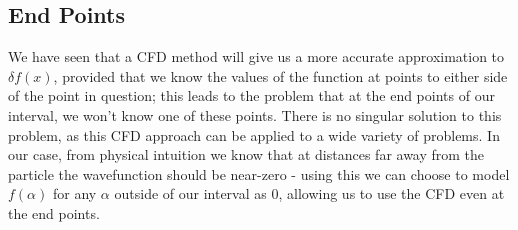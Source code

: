 \subsection{End Points}
We have seen that a CFD method will give us a more accurate approximation to $\delta f(x)$, provided that we know the values of the function at points to either side of the point in question; this leads to the problem that at the end points of our interval, we won't know one of these points. There is no singular solution to this problem, as this CFD approach can be applied to a wide variety of problems. In our case, from physical intuition we know that at distances far away from the particle the wavefunction should be near-zero - using this we can choose to model $f(\alpha)$ for any $\alpha$ outside of our interval as $0$, allowing us to use the CFD even at the end points.


